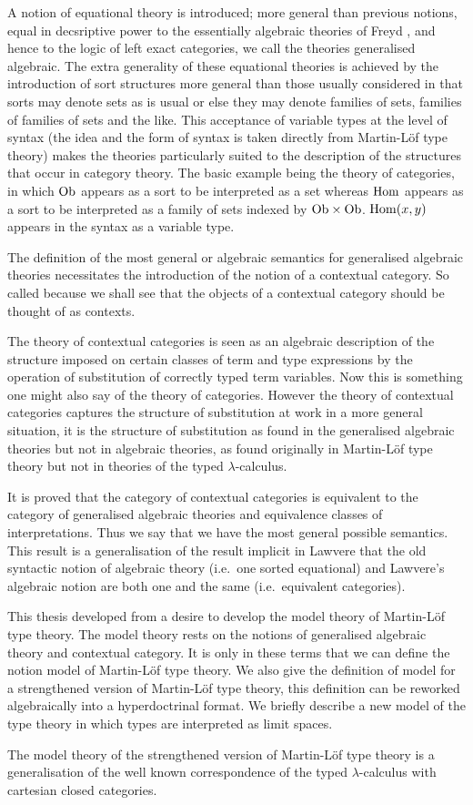 
A notion of equational theory is introduced; more general than previous notions, equal in decsriptive power to the essentially algebraic theories of Freyd \cite{freyd:aspects-of-topoi}, and hence to the logic of left exact categories, we call the theories generalised algebraic.
%
The extra generality of these equational theories is achieved by the introduction of sort structures more general than those usually considered in that sorts may denote sets as is usual or else they may denote families of sets, families of families of sets and the like.
%
This acceptance of variable types at the level of syntax (the idea and the form of syntax is taken directly from Martin-Löf type theory) makes the theories particularly suited to the description of the structures that occur in category theory.
%
The basic example being the theory of categories, in which $\mathrm{Ob}$ appears as a sort to be interpreted as a set whereas $\mathrm{Hom}$ appears as a sort to be interpreted as a family of sets indexed by $\mathrm{Ob} \times \mathrm{Ob}$.
%
$\mathrm{Hom}(x,y)$ appears in the syntax as a variable type.

The definition of the most general or algebraic semantics for generalised algebraic theories necessitates the introduction of the notion of a contextual category.
%
So called because we shall see that the objects of a contextual category should be thought of as contexts.

The theory of contextual categories is seen as an algebraic description of the structure imposed on certain classes of term and type expressions by the operation of substitution of correctly typed term variables.
%
Now this is something one might also say of the theory of categories.
%
However the theory of contextual categories captures the structure of substitution at work in a more general situation, it is the structure of substitution as found in the generalised algebraic theories but not in algebraic theories, as found originally in Martin-Löf type theory but not in theories of the typed $\lambda$-calculus.

It is proved that the category of contextual categories is equivalent to the category of generalised algebraic theories and equivalence classes of interpretations.
%
Thus we say that we have the most general possible semantics.
%
This result is a generalisation of the result implicit in Lawvere \cite{lawvere:11} that the old syntactic notion of algebraic theory (i.e.\ one sorted equational) and Lawvere's algebraic notion are both one and the same (i.e.\ equivalent categories).

This thesis developed  from a desire to develop the model theory of Martin-Löf type theory.
%
The model theory rests on the notions of generalised algebraic theory and contextual category.
%
It is only in these terms that we can define the notion model of Martin-Löf type theory.
%
We also give the definition of model for a strengthened version of Martin-Löf type theory, this definition can be reworked algebraically into a hyperdoctrinal format.
%
We briefly describe a new model of the type theory in which types are interpreted as limit spaces.

The model theory of the strengthened version of Martin-Löf type theory is a generalisation of the well known correspondence of the typed $\lambda$-calculus with cartesian closed categories.
